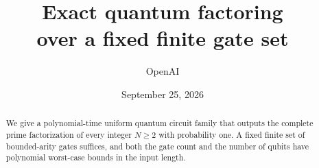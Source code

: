 \documentclass[11pt]{article}
\title{Exact quantum factoring\protect\\over a fixed finite gate set}
\author{OpenAI}
\date{September 25, 2026}
\theoremstyle{definition}
\theoremstyle{remark}
\begin{document}
\maketitle
\begin{abstract}
We give a polynomial-time uniform quantum circuit family that outputs the complete prime factorization of every integer $N\ge2$ with probability one. A fixed finite set of bounded-arity gates suffices, and both the gate count and the number of qubits have polynomial worst-case bounds in the input length.
\end{abstract}






\appendix

\clearpage

\end{document}
